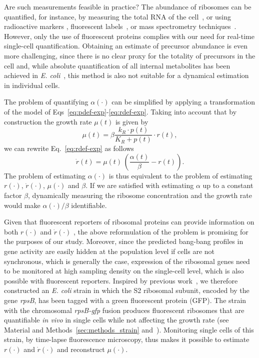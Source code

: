 Are such measurements feasible in practice?
The abundance of ribosomes can be quantified, for instance, by measuring the total RNA of the cell~\cite{scott_interdependence_2010}, or using radioactive markers \cite{gausing_regulation_1980,zengel_transcription_1986}, fluorescent labels~\cite{bakshi_superresolution_2012}, or mass spectrometry techniques~\cite{hui_quantitative_2015}.
However, only the use of fluorescent proteins complies with our need for real-time single-cell quantification.
Obtaining an estimate of precursor abundance is even more challenging, since there is no clear proxy for the totality of precursors in the cell and, while absolute quantification of all internal metabolites has been achieved in \textit{E. coli}~\cite{bennett_absolute_2009}, this method is also not suitable for a dynamical estimation in individual cells.

The problem of quantifying $\alpha (\cdot)$ can be simplified by applying a transformation of the model of Eqs~\ref{eq:pdef-exp}-\ref{eq:rdef-exp}.
Taking into account that by construction the growth rate $\mu(t)$ is given by
\[
	\mu (t) = \beta \frac{k_R \cdot p(t)}{K_R + p(t)} \cdot r(t),
\]
we can rewrite Eq.~\ref{eq:rdef-exp} as follows
\begin{equation}
\label{eq:dot_r}
\dot{r}(t) = \mu (t) \, \left(\frac{\alpha(t)}{\beta} - r(t) \right).
\end{equation}
The problem of estimating $\alpha(\cdot)$ is thus equivalent to the problem of estimating $r(\cdot)$, $\dot{r}(\cdot)$, $\mu (\cdot)$ and $\beta$.
If we are satisfied with estimating $\alpha$ up to a constant factor $\beta$, dynamically measuring the ribosome concentration and the growth rate would make $\alpha (\cdot) / \beta$ identifiable. 

Given that fluorescent reporters of ribosomal proteins can provide information on both $r(\cdot)$ and $\dot{r}(\cdot)$ \cite{zulkower_robust_2015}, the above reformulation of the problem is promising for the purposes of our study.
Moreover, since the predicted bang-bang profiles in gene activity are easily hidden at the population level if cells are not synchronous, which is generally the case, expression of the ribosomal genes need to be monitored at high sampling density on the single-cell level, which is also possible with fluorescent reporters.
Inspired by previous work~\cite{bakshi_superresolution_2012}, we therefore constructed an \textit{E. coli} strain in which the S2 ribosomal subunit, encoded by the gene \textit{rpsB}, has been tagged with a green fluorescent protein (GFP).
The strain with the chromosomal \textit{rpsB-gfp} fusion produces fluorescent ribosomes that are quantifiable \textit{in vivo} in single cells while not affecting the growth rate (see Material and Methods~\ref{sec:methods_strain} and~\cite{bakshi_superresolution_2012}).
Monitoring single cells of this strain, by time-lapse fluorescence microscopy, thus makes it possible to estimate $r(\cdot)$ and $\dot{r}(\cdot)$ and reconstruct $\mu(\cdot)$.

